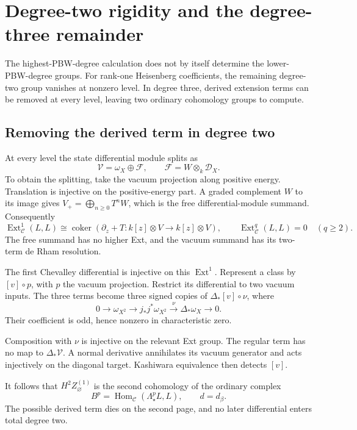 \section{Degree-two rigidity and the degree-three remainder}
\label{v4-arith:centers:sec:low-degree-rigidity}

The highest-PBW-degree calculation does not by
itself determine the lower-PBW-degree groups.
For rank-one Heisenberg coefficients, the
remaining degree-two group vanishes at
nonzero level. In degree three, derived
extension terms can be removed at every
level, leaving two ordinary cohomology
groups to compute.

\subsection{Removing the derived term in degree two}
\label{v4-arith:centers:subsec:derived-two}

At every level the state differential
module splits as
\[
 \mathscr V=\omega_X\oplus\mathscr F,
 \qquad \mathscr F=W\otimes_k\mathcal D_X.
\]
To obtain the splitting, take the
vacuum projection along positive
energy. Translation is injective
on the positive-energy part.
A graded complement $W$ to its
image gives
$V_+=\bigoplus_{n\geq0}T^nW$,
which is the free differential-module
summand.
Consequently
\[
 \operatorname{Ext}^1_{\mathcal C}(L,L)
 \cong
 \operatorname{coker}(\partial_z+T:k[z]\otimes V\to k[z]\otimes V),
 \qquad
 \operatorname{Ext}^{q}_{\mathcal C}(L,L)=0\quad(q\geq2).
\]
The free summand has no higher
Ext, and the vacuum summand
has its two-term de Rham
resolution.

The first Chevalley differential
is injective on this
$\operatorname{Ext}^1$.
Represent a class by
$[v]\circ p$, with $p$
the vacuum projection.
Restrict its differential
to two vacuum inputs.
The three terms become
three signed copies of
$\Delta_*[v]\circ\nu$,
where
\[
 0\to\omega_{X^2}\to
 j_*j^*\omega_{X^2}
 \xrightarrow{\nu}\Delta_*\omega_X\to0.
\]
Their coefficient is odd,
hence nonzero in characteristic
zero.

Composition with $\nu$ is injective on the relevant Ext group.
The regular term has no map to $\Delta_*\mathscr V$.
A normal derivative annihilates its vacuum generator and acts
injectively on the diagonal target.
Kashiwara equivalence
then detects $[v]$.

It follows that
$H^2Z_\varnothing^{(1)}$
is the second cohomology
of the ordinary complex
\[
 B^p=\operatorname{Hom}_{\mathcal C}
       (\Lambda^p_\star L,L),
 \qquad d=d_\beta.
\]
The possible derived
term dies on the second
page, and no later
differential enters
total degree two.

